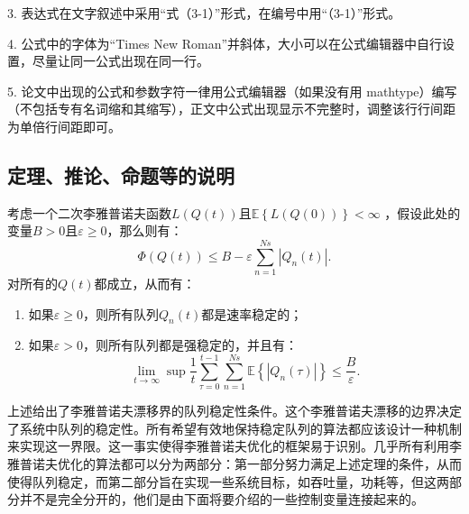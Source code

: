 \textcolor[rgb]{1.00,0.00,0.00}{3. 表达式在文字叙述中采用“式（3-1）”形式，在编号中用“（3-1）”形式。}

\textcolor[rgb]{1.00,0.00,0.00}{4. 公式中的字体为“Times New Roman”并斜体，大小可以在公式编辑器中自行设置，尽量让同一公式出现在同一行。}

\textcolor[rgb]{1.00,0.00,0.00}{5. 论文中出现的公式和参数字符一律用公式编辑器（如果没有用 mathtype）编写（不包括专有名词缩和其缩写），正文中公式出现显示不完整时，调整该行行间距为单倍行间距即可。}

\subsection{定理、推论、命题等的说明}

\begin{TheoremJXD}\label{Theorem1-1}
	{考虑一个二次李雅普诺夫函数$L\left( {Q\left( t \right)} \right)$且$\mathbb{E}\left\{ {L\left( {Q\left( 0 \right)} \right)} \right\} < \infty $ ，假设此处的变量$B > 0$且$\varepsilon  \ge 0$，那么则有：
		\begin{equation}\label{Eq1-2}
			\Phi \left( {Q\left( t \right)} \right) \le B - \varepsilon \sum\limits_{n = 1}^{Ns} {\left| {{Q_n}\left( t \right)} \right|}.
		\end{equation}
		对所有的$Q\left( t \right)$都成立，从而有：
		\begin{enumerate}
			\item {如果$\varepsilon  \ge 0$，则所有队列${Q_n}\left( t \right)$都是速率稳定的；}
			\item {如果$\varepsilon  > 0$，则所有队列都是强稳定的，并且有：
			      \begin{equation}\label{Eq1-3}
				      \mathop {\lim }\limits_{t \to \infty } \sup \frac{1}{t}\sum\limits_{\tau  = 0}^{t - 1} {\sum\limits_{n = 1}^{Ns}\mathbb{E} {\left\{ {\left| {{Q_n}\left( \tau  \right)} \right|} \right\}} }  \le \frac{B}{\varepsilon }.
			      \end{equation}
			      }
		\end{enumerate}
	}
\end{TheoremJXD}
\vspace{0.5em}
上述给出了李雅普诺夫漂移界的队列稳定性条件。这个李雅普诺夫漂移的边界决定了系统中队列的稳定性。所有希望有效地保持稳定队列的算法都应该设计一种机制来实现这一界限。这一事实使得李雅普诺夫优化的框架易于识别。几乎所有利用李雅普诺夫优化的算法都可以分为两部分：第一部分努力满足上述定理的条件，从而使得队列稳定，而第二部分旨在实现一些系统目标，如吞吐量，功耗等，但这两部分并不是完全分开的，他们是由下面将要介绍的一些控制变量连接起来的。

